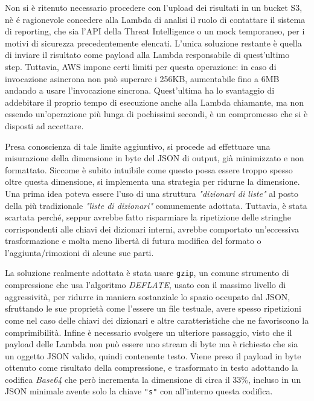 Non si è ritenuto necessario procedere con l'upload dei risultati in un bucket S3, nè é ragionevole concedere alla Lambda di analisi il ruolo di contattare il sistema di reporting, che sia l'API della Threat Intelligence o un mock temporaneo, per i motivi di sicurezza precedentemente elencati. L'unica soluzione restante è quella di inviare il risultato come payload alla Lambda responsabile di quest'ultimo step. Tuttavia, AWS impone certi limiti per questa operazione: in caso di invocazione asincrona non può superare i 256KB, aumentabile fino a 6MB andando a usare l'invocazione sincrona. Quest'ultima ha lo svantaggio di addebitare il proprio tempo di esecuzione anche alla Lambda chiamante, ma non essendo un'operazione più lunga di pochissimi secondi, è un compromesso che si è disposti ad accettare.

Presa conoscienza di tale limite aggiuntivo, si procede ad effettuare una misurazione della dimensione in byte del JSON di output, già minimizzato e non formattato. Siccome è subito intuibile come questo possa essere troppo spesso oltre questa dimensione, si implementa una strategia per ridurne la dimensione.
Una prima idea poteva essere l'uso di una struttura \emph{"dizionari di liste"} al posto della più tradizionale \emph{"liste di dizionari"} comunemente adottata. Tuttavia, è stata scartata perché, seppur avrebbe fatto risparmiare la ripetizione delle stringhe corrispondenti alle chiavi dei dizionari interni, avrebbe comportato un'eccessiva trasformazione e molta meno libertà di futura modifica del formato o l'aggiunta/rimozioni di alcune sue parti.

La soluzione realmente adottata è stata usare \texttt{gzip}, un comune strumento di compressione che usa l'algoritmo \emph{DEFLATE}, usato con il massimo livello di aggressività,
per ridurre in maniera sostanziale lo spazio occupato dal JSON,
sfruttando le sue proprietà come l'essere un file testuale, avere spesso ripetizioni come nel caso delle chiavi dei dizionari e altre caratteristiche che ne favoriscono la comprimibilità.
Infine è necessario svolgere un ulteriore passaggio, visto che il payload delle Lambda non può essere uno stream di byte ma è richiesto che sia un oggetto JSON valido, quindi contenente testo. 
Viene preso il payload in byte ottenuto come risultato della compressione, e trasformato in testo adottando la codifica \emph{Base64} che però incrementa la dimensione di circa il 33\%, incluso in un JSON minimale avente solo la chiave \texttt{"s"} con all'interno questa codifica.

